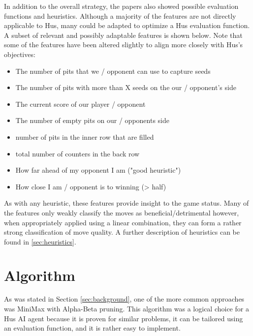 \documentclass[]{article}
\begin{document}
In addition to the overall strategy, the papers also showed possible evaluation functions and heuristics. Although a majority of the features are not directly applicable to Hus, many could be adapted to optimize a Hus evaluation function. A subset of relevant and possibly adaptable features is shown below. Note that some of the features have been altered slightly to align more closely with Hus's objectives:

\begin{itemize}
\item The number of pits that we / opponent can use to capture seeds \cite{abayomi2013overview}
\item The number of pits with more than X seeds on the our / opponent’s side \cite{abayomi2013overview} 
\item The current score of our player / opponent \cite{abayomi2013overview}
\item The number of empty pits on our / opponents side \cite{abayomi2013overview}

\item number of pits in the inner row that are filled \cite{donkers2002programming}
\item total number of counters in the back row \cite{donkers2002programming}

\item How far ahead of my opponent I am ("good heuristic") \cite{gifford2008searching}
\item How close I am / opponent is to winning (> half) \cite{gifford2008searching}
\end{itemize}

As with any heuristic, these features provide insight to the game status. Many of the features only weakly classify the moves as beneficial/detrimental however, when appropriately applied using a linear combination, they can form a rather strong classification of move quality. A further description of heuristics can be found in \ref{sec:heuristics}.


\section{Algorithm}
As was stated in Section \ref{sec:background}, one of the more common approaches was MiniMax with Alpha-Beta pruning. This algorithm was a logical choice for a Hus AI agent because it is proven for similar problems, it can be tailored using an evaluation function, and it is rather easy to implement. 
\end{document}
